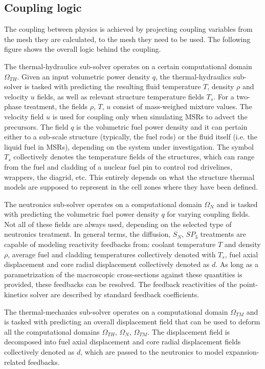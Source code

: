 \subsection*{Coupling logic}

The coupling between physics is achieved by projecting coupling variables from the mesh they are calculated, to the mesh they need to be used. The following figure shows the overall logic behind the coupling.



The thermal-\/hydraulics sub-\/solver operates on a certain computational domain $\Omega_{TH}$. Given an input volumetric power density $q$, the thermal-\/hydraulics sub-\/solver is tasked with predicting the resulting fluid temperature $T$, density $\rho$ and velocity $u$ fields, as well as relevant structure temperature fields $T_s$. For a two-\/phase treatment, the fields $\rho$, $T$, $u$ consist of mass-\/weighed mixture values. The velocity field $u$ is used for coupling only when simulating M\+S\+Rs to advect the precursors. The field $q$ is the volumetric fuel power density and it can pertain either to a sub-\/scale structure (typically, the fuel rods) or the fluid itself (i.\+e. the liquid fuel in M\+S\+Rs), depending on the system under investigation. The symbol $T_s$ collectively denotes the temperature fields of the structures, which can range from the fuel and cladding of a nuclear fuel pin to control rod drivelines, wrappers, the diagrid, etc. This entirely depends on what the structure thermal models are supposed to represent in the cell zones where they have been defined.

The neutronics sub-\/solver operates on a computational domain $\Omega_N$ and is tasked with predicting the volumetric fuel power density $q$ for varying coupling fields. Not all of these fields are always used, depending on the selected type of neutronics treatment. In general terms, the diffusion, $S_N$, $SP_3$ treatments are capable of modeling reactivity feedbacks from\+: coolant temperature $T$ and density $\rho$, average fuel and cladding temperatures collectively denoted with $T_s$, fuel axial displacement and core radial displacement collectively denoted as $d$. As long as a parametrization of the macroscopic cross-\/sections against these quantities is provided, these feedbacks can be resolved. The feedback reactivities of the point-\/kinetics solver are described by standard feedback coefficients.

The thermal-\/mechanics sub-\/solver operates on a computational domain $\Omega_{TM}$ and is tasked with predicting an overall displacement field that can be used to deform all the computational domains $\Omega_{TH}$, $\Omega_{N}$, $\Omega_{TM}$. The displacement field is decomposed into fuel axial displacement and core radial displacement fields collectively denoted as $d$, which are passed to the neutronics to model expansion-\/related feedbacks.

